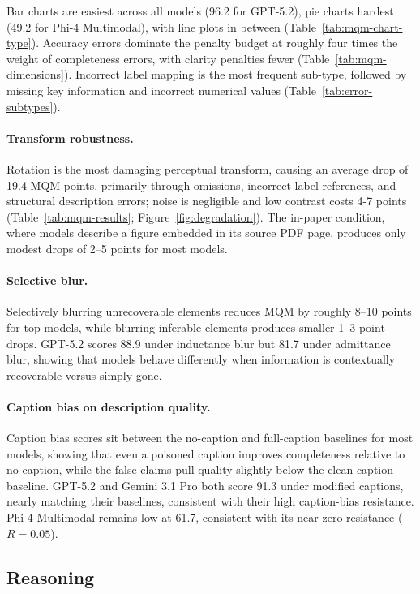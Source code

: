 Bar charts are easiest across all models (96.2 for GPT-5.2), pie charts hardest (49.2 for Phi-4 Multimodal), with line plots in between (Table~\ref{tab:mqm-chart-type}). Accuracy errors dominate the penalty budget at roughly four times the weight of completeness errors, with clarity penalties fewer (Table~\ref{tab:mqm-dimensions}). Incorrect label mapping is the most frequent sub-type, followed by missing key information and incorrect numerical values (Table~\ref{tab:error-subtypes}).

\paragraph{Transform robustness.}
Rotation is the most damaging perceptual transform, causing an average drop of 19.4 MQM points, primarily through omissions, incorrect label references, and structural description errors; noise is negligible and low contrast costs 4-7 points (Table~\ref{tab:mqm-results}; Figure~\ref{fig:degradation}). The in-paper condition, where models describe a figure embedded in its source PDF page, produces only modest drops of 2--5 points for most models.

\paragraph{Selective blur.}
Selectively blurring unrecoverable elements reduces MQM by roughly 8--10 points for top models, while blurring inferable elements produces smaller 1--3 point drops. GPT-5.2 scores 88.9 under inductance blur but 81.7 under admittance blur, showing that models behave differently when information is contextually recoverable versus simply gone.

\paragraph{Caption bias on description quality.}
Caption bias scores sit between the no-caption and full-caption baselines for most models, showing that even a poisoned caption improves completeness relative to no caption, while the false claims pull quality slightly below the clean-caption baseline. GPT-5.2 and Gemini 3.1 Pro both score 91.3 under modified captions, nearly matching their baselines, consistent with their high caption-bias resistance. Phi-4 Multimodal remains low at 61.7, consistent with its near-zero resistance ($R = 0.05$).

\subsection{Reasoning}
\label{sec:reasoning-results}

